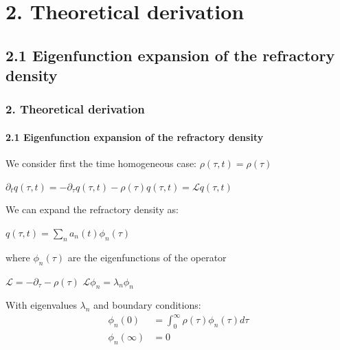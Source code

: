 \documentclass{beamer}
\begin{document}
\section{2. Theoretical derivation}
\subsection{2.1 Eigenfunction expansion of the refractory density}

\begin{frame}
\frametitle{2. Theoretical derivation}
\framesubtitle{2.1 Eigenfunction expansion of the refractory density}

We consider first the time homogeneous case: $\rho(\tau,t)=\rho(\tau)$

\vspace{0.2cm}
\hspace{2.9cm}$
\partial_t q(\tau,t)=-\partial_\tau q(\tau,t)-\rho(\tau)q(\tau,t)=\mathcal{L}q(\tau,t)
$

\pause
\vspace{0.3cm}
We can expand the refractory density as:

\vspace{0.2cm}
\hspace{3.1cm}
$q(\tau,t)=\sum_n a_n(t)\phi_n(\tau) $

\pause
\vspace{0.3cm}
where $\phi_n(\tau)$ are the eigenfunctions of the operator 

\vspace{0.2cm}
 \hspace{1.2cm} $\mathcal{L}=-\partial_{\tau}-\rho(\tau)$ \hspace{1cm}$
\mathcal{L}\phi_n=\lambda_n\phi_n
$

\vspace{0.3cm}
With eigenvalues $\lambda_n$ and boundary conditions:
\begin{align}
\phi_n(0)&=\int_{0}^{\infty}\rho(\tau)\phi_n(\tau)d\tau \nonumber\\
\phi_n(\infty)&=0 \nonumber
\end{align}


\end{frame}
\end{document}

